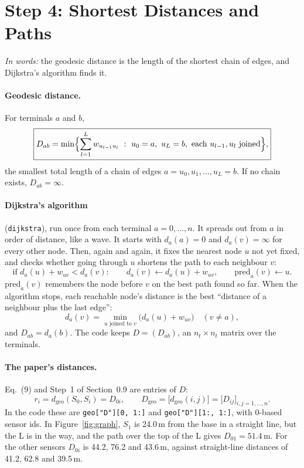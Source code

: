 \documentclass[10pt]{article}
\newcommand{\code}[1]{\texttt{#1}}
\newcommand{\dgeo}{d_{\mathrm{geo}}}
\newcommand{\pred}{\mathrm{pred}}
\begin{document}
\section{Step 4: Shortest Distances and Paths}
\label{sec:dijkstra}

\emph{In words:} the geodesic distance is the length of the shortest chain of edges, and Dijkstra's algorithm finds it.

\paragraph{Geodesic distance.} For terminals $a$ and $b$,
\begin{equation}
  \boxed{D_{ab} = \min\Bigl\{ \sum_{l=1}^{L} w_{u_{l-1} u_l} \ :\ u_0 = a,\ u_L = b,\
  \text{each } u_{l-1}, u_l \text{ joined} \Bigr\},}
  \label{eq:D}
\end{equation}
the smallest total length of a chain of edges $a = u_0, u_1, \ldots, u_L = b$. If no chain exists, $D_{ab} = \infty$.

\paragraph{Dijkstra's algorithm} (\code{dijkstra}), run once from each terminal $a = 0, \ldots, n$. It spreads out from
$a$ in order of distance, like a wave. It starts with $d_a(a) = 0$ and $d_a(v) = \infty$ for every other node. Then, again
and again, it fixes the nearest node $u$ not yet fixed, and checks whether going through $u$ shortens the path to each
neighbour $v$:
\begin{equation}
  \text{if } d_a(u) + w_{uv} < d_a(v): \qquad d_a(v) \leftarrow d_a(u) + w_{uv}, \qquad \pred_a(v) \leftarrow u.
  \label{eq:relax}
\end{equation}
$\pred_a(v)$ remembers the node before $v$ on the best path found so far. When the algorithm stops, each reachable node's
distance is the best ``distance of a neighbour plus the last edge'':
\begin{equation}
  d_a(v) = \min_{u \text{ joined to } v} \bigl( d_a(u) + w_{uv} \bigr) \quad (v \ne a),
  \label{eq:bellman}
\end{equation}
and $D_{ab} = d_a(b)$. The code keeps $D = (D_{ab})$, an $n_t \times n_t$ matrix over the terminals.

\paragraph{The paper's distances.} Eq.~(9) and Step~1 of Section~0.9 are entries of $D$:
\begin{equation}
  r_i = \dgeo(S_0, S_i) = D_{0i}, \qquad
  D_{\mathrm{geo}} = \bigl[\dgeo(i, j)\bigr] = \bigl[D_{ij}\bigr]_{i, j = 1, \ldots, n}.
  \label{eq:paper}
\end{equation}
In the code these are \code{geo["D"][0, 1:]} and \code{geo["D"][1:, 1:]}, with 0-based sensor ids. In
Figure~\ref{fig:graph}, $S_1$ is 24.0\,m from the base in a straight line, but the L is in the way, and the path over the
top of the L gives $D_{01} = 51.4$\,m. For the other sensors $D_{0i}$ is 44.2, 76.2 and 43.6\,m, against straight-line
distances of 41.2, 62.8 and 39.5\,m.
\end{document}
